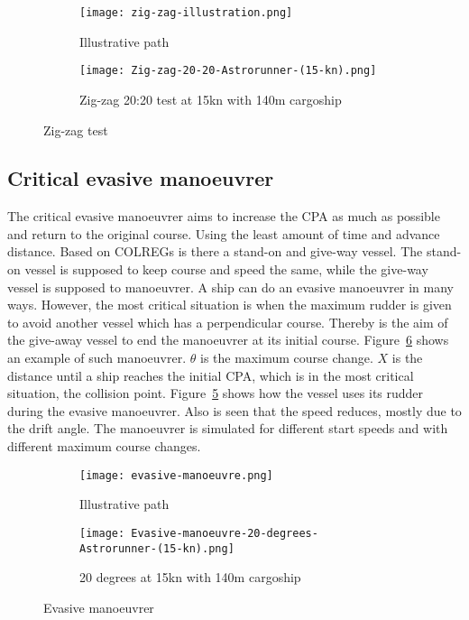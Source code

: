 \begin{figure}[p]
	\begin{subfigure}[b]{0.43\linewidth}
		\centering
		\texttt{[image: zig-zag-illustration.png]}
		\caption{Illustrative path}
		\label{fig:zig-zag-path}
	\end{subfigure} 
	\begin{subfigure}[b]{0.56\linewidth}
		\centering
		\texttt{[image: Zig-zag-20-20-Astrorunner-(15-kn).png]}
		\caption{Zig-zag 20:20 test at 15kn with 140m cargoship}
		\label{fig:zig-zag-astrorunner}
	\end{subfigure}
	\caption{Zig-zag test}
	\label{fig:zig-zag} 
\end{figure}

\newpage

\subsection{Critical evasive manoeuvrer}
\label{sec:evasive-manoeuvrer}
The critical evasive manoeuvrer aims to increase the \acf{CPA} as much as possible and return to the original course. Using the least amount of time and advance distance. Based on \ac{COLREGs} is there a stand-on and give-way vessel. The stand-on vessel is supposed to keep course and speed the same, while the give-way vessel is supposed to manoeuvrer. 
A ship can do an evasive manoeuvrer in many ways. However, the most critical situation is when the maximum rudder is given to avoid another vessel which has a perpendicular course. Thereby is the aim of the give-away vessel to end the manoeuvrer at its initial course. Figure~\ref{fig:evasive-manoeuvrer} shows an example of such manoeuvrer. $\theta$ is the maximum course change. $X$ is the distance until a ship reaches the initial CPA, which is in the most critical situation, the collision point. Figure~\ref{fig:astrorunner-evasive-20} shows how the vessel uses its rudder during the evasive manoeuvrer. Also is seen that the speed reduces, mostly due to the drift angle. The manoeuvrer is simulated for different start speeds and with different maximum course changes. 

\begin{figure}[hbp]
	\begin{subfigure}[b]{0.43\linewidth}
		\centering
		\texttt{[image: evasive-manoeuvre.png]}
		\caption{Illustrative path}
		\label{fig:evasive-manoeuvrer-path}
	\end{subfigure} 
	\begin{subfigure}[b]{0.56\linewidth}
		\centering
		\texttt{[image: Evasive-manoeuvre-20-degrees-Astrorunner-(15-kn).png]}
		\caption{20 degrees at 15kn with 140m cargoship}
		\label{fig:astrorunner-evasive-20}
	\end{subfigure}
	\caption{Evasive manoeuvrer}
	\label{fig:evasive-manoeuvrer} 
\end{figure}
\clearpage

